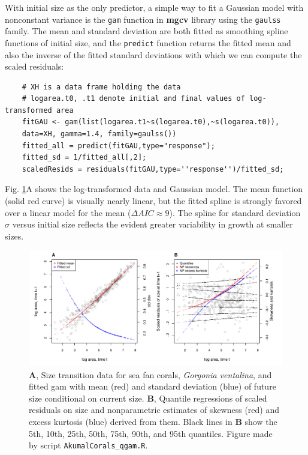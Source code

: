 \documentclass[12pt]{article}
\begin{document}
With initial size as the only predictor, a simple way to fit a Gaussian model with nonconstant variance is the \texttt{gam} function in \textbf{mgcv} library \citep{wood-2017} using the \texttt{gaulss} family. 
The mean and standard deviation are both fitted as smoothing spline functions of initial size, and the \texttt{predict} function returns the fitted mean and also the inverse of the fitted standard deviations with which we can compute the scaled residuals: 
\begin{lstlisting}
	# XH is a data frame holding the data
	# logarea.t0, .t1 denote initial and final values of log-transformed area   
	fitGAU <- gam(list(logarea.t1~s(logarea.t0),~s(logarea.t0)),
	data=XH, gamma=1.4, family=gaulss())
	fitted_all = predict(fitGAU,type="response"); 
	fitted_sd = 1/fitted_all[,2]; 
	scaledResids = residuals(fitGAU,type=''response'')/fitted_sd;  
\end{lstlisting}
Fig. \ref{fig:coral_diagnostics}A shows the log-transformed data and Gaussian model. 
The mean function (solid red curve) is visually nearly linear, but the fitted spline is strongly favored over a linear model for the mean ($\Delta AIC \approx 9$). 
The spline for standard deviation $\sigma$ versus initial size reflects the evident greater variability in growth at smaller sizes.  

\begin{figure}[tbp]
	\centering
	\includegraphics[width=1.0\textwidth]{figures/coral_qgam_diagnostics.pdf}
	\caption{\textbf{A}, Size transition data for sea fan corals, \emph{Gorgonia ventalina}, and fitted gam with mean (red) and standard deviation (blue) of future size conditional on current size.  \textbf{B}, Quantile regressions of scaled residuals on size and nonparametric estimates of skewness (red) and excess kurtosis (blue) derived from them. Black lines in \textbf{B} show the 5th, 10th, 25th, 50th, 75th, 90th, and 95th quantiles. Figure made by script \texttt{AkumalCorals\_qgam.R}.}
	\label{fig:coral_diagnostics}
\end{figure} 
\end{document}
